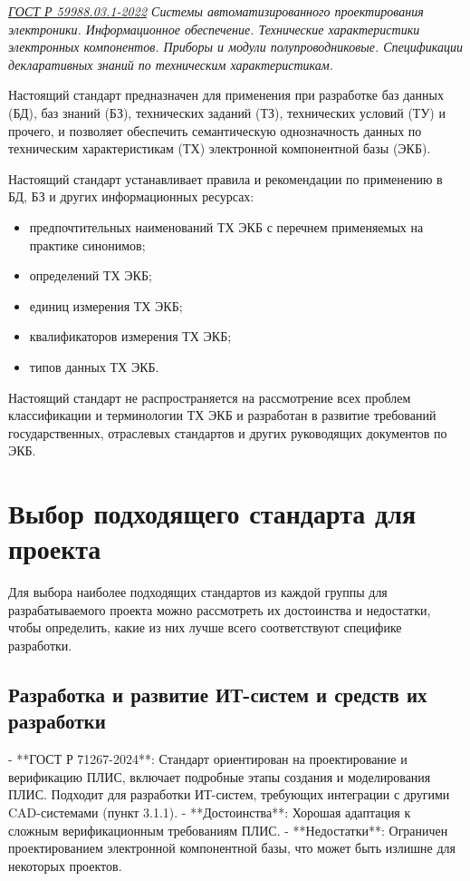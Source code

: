 \emph{\href{https://docs.cntd.ru/document/1200195155}{ГОСТ Р 59988.03.1-2022}
Системы автоматизированного проектирования электроники.
Информационное обеспечение.
Технические характеристики электронных компонентов.
Приборы и модули полупроводниковые.
Спецификации декларативных знаний по техническим характеристикам.
}

Настоящий стандарт предназначен для применения при разработке
баз данных (БД), баз знаний (БЗ), технических заданий (ТЗ),
технических условий (ТУ) и прочего,
и позволяет обеспечить семантическую однозначность данных
по техническим характеристикам (ТХ) электронной компонентной базы (ЭКБ).

Настоящий стандарт устанавливает правила и рекомендации
по применению в БД, БЗ и других информационных ресурсах:

\begin{itemize}
	\item предпочтительных наименований ТХ ЭКБ
		с перечнем применяемых на практике синонимов;
	\item определений ТХ ЭКБ;
	\item единиц измерения ТХ ЭКБ;
	\item квалификаторов измерения ТХ ЭКБ;
	\item типов данных ТХ ЭКБ.
\end{itemize}

Настоящий стандарт не распространяется на рассмотрение
всех проблем классификации и терминологии ТХ ЭКБ
и разработан в развитие требований государственных, отраслевых стандартов
и других руководящих документов по ЭКБ.

\clearpage

\section{Выбор подходящего стандарта для проекта}

Для выбора наиболее подходящих стандартов из каждой группы для разрабатываемого проекта можно рассмотреть их достоинства и недостатки, чтобы определить, какие из них лучше всего соответствуют специфике разработки.

\subsection{Разработка и развитие ИТ-систем и средств их разработки}

- **ГОСТ Р 71267-2024**: Стандарт ориентирован на проектирование и верификацию ПЛИС, включает подробные этапы создания и моделирования ПЛИС. Подходит для разработки ИТ-систем, требующих интеграции с другими CAD-системами (пункт 3.1.1).
  - **Достоинства**: Хорошая адаптация к сложным верификационным требованиям ПЛИС.
  - **Недостатки**: Ограничен проектированием электронной компонентной базы, что может быть излишне для некоторых проектов.

